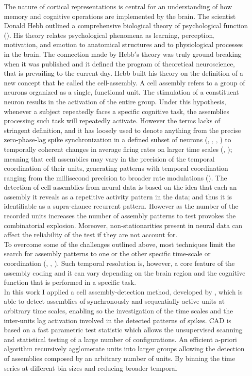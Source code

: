 The nature of cortical representations is central for an understanding of how memory and cognitive operations are implemented by the brain. The scientist Donald Hebb outlined a comprehensive biological theory of psychological function (\cite{Hebb}). His theory relates psychological phenomena as learning, perception, motivation, and emotion to anatomical structures and to physiological processes in the brain. The connection made by Hebb$'$s theory was truly ground breaking when it was published and it defined the program of theoretical neuroscience, that is prevailing to the current day. Hebb built his theory on the definition of a new concept that he called the cell-assembly. A cell assembly refers to a group of neurons organized as a single, functional unit. The stimulation of a constituent neuron results in the activation of the entire group. Under this hypothesis, whenever a subject repeatedly faces a specific cognitive task, the assemblies processing such task will repeatedly activate. However the terms lacks of stringent definition, and it has loosely used to denote anything from the precise zero-phase-lag spike synchronization in a defined subset of neurons (\cite{Abeles}, \cite{Roelfsema}, \cite{Diesmann}, \cite{Harris2003}) to temporally coherent changes in average firing rates on larger time scales (\cite{Goldman}, \cite{Durstewitz}); meaning that cell assemblies may vary in the precision of the temporal coordination of their units, generating patterns with temporal coordination ranging from the millisecond precision to broader rate modulations (\cite{RussoDurstewitz}). The detection of cell assemblies from neural data is based on the idea that each an assembly it reveals as a repetitive activity pattern in the data; and thus it is identifiable as a supra-chance recurrent pattern. However as the number of the recorded units increases the number of assembly patterns to test provokes the combinatorial explosion. Moreover, non-stationarities present in neural data can affect the reliability of the test if they are not account for.\\To overcome some of the challenges outlined above, most techniques limit the search for assembly patterns to one or the other specific time-scale or coordination (\cite{Torre}, \cite{Gruen} \cite{Tavoni}, \cite{Billeh}). Such temporal resolution is, however, a core feature of the assembly coding and it can vary depending on the brain region and the cognitive function that is performed in a specific task.\\In this work I applied a cell assembly-detection method, developed by , which is able to detect assemblies of synchronously and sequentially active units at arbitrary time scales, enabling so the investigation of the time scales and the inter-units lag activation involved in the detected patterns of spikes. CAD is based on a fast parametric test statistic which allows the unsupervised scanning and statistical testing of a large number of configurations. An efficient a-priori algorithm recursively agglomerate units into larger groups allowing the detection of assemblies composed by an arbitrary number of units. By binning the time series at different bin sizes and reducing broader temporal 